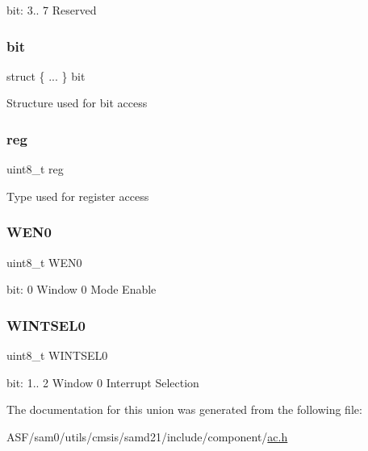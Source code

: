 bit\+: 3.. 7 Reserved \mbox{\label{union_a_c___w_i_n_c_t_r_l___type_ac747914da1b8a36c9e2ac6cf22aac938}} 
\subsubsection{\texorpdfstring{bit}{bit}}
{\footnotesize\ttfamily struct \{ ... \}   bit}

Structure used for bit access \mbox{\label{union_a_c___w_i_n_c_t_r_l___type_a9428adc9af4653a2050e2536b55dec8d}} 
\subsubsection{\texorpdfstring{reg}{reg}}
{\footnotesize\ttfamily uint8\+\_\+t reg}

Type used for register access \mbox{\label{union_a_c___w_i_n_c_t_r_l___type_a18b77b5ab88790454389633019b309f0}} 
\subsubsection{\texorpdfstring{WEN0}{WEN0}}
{\footnotesize\ttfamily uint8\+\_\+t W\+E\+N0}

bit\+: 0 Window 0 Mode Enable \mbox{\label{union_a_c___w_i_n_c_t_r_l___type_a564a6fad73f4fb70c2f1df3bf586aff4}} 
\subsubsection{\texorpdfstring{WINTSEL0}{WINTSEL0}}
{\footnotesize\ttfamily uint8\+\_\+t W\+I\+N\+T\+S\+E\+L0}

bit\+: 1.. 2 Window 0 Interrupt Selection 

The documentation for this union was generated from the following file\+:\begin{DoxyCompactItemize}
\item 
A\+S\+F/sam0/utils/cmsis/samd21/include/component/\mbox{\hyperlink{component_2ac_8h}{ac.\+h}}\end{DoxyCompactItemize}
